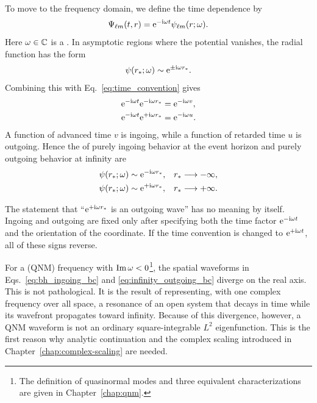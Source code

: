 To move to the frequency domain, we define the time dependence by
\begin{equation}
\Psi_{\ell m}(t,r)
=
\mathrm{e}^{-\mathrm{i}\omega t}\psi_{\ell m}(r;\omega).
\label{eq:time_convention}
\end{equation}
Here $\omega\in\mathbb{C}$ is a . In asymptotic regions where the potential vanishes, the radial function has the form
\begin{equation}
\psi(r_*;\omega)
\sim
\mathrm{e}^{\mathord{\pm}\mathrm{i}\omega r_*}.
\label{eq:asymptotic_plane_waves}
\end{equation}
Combining this with Eq.~\eqref{eq:time_convention} gives
\begin{align}
\mathrm{e}^{-\mathrm{i}\omega t}\mathrm{e}^{-\mathrm{i}\omega r_*}
&=
\mathrm{e}^{-\mathrm{i}\omega v},
\label{eq:ingoing_wave}
\\
\mathrm{e}^{-\mathrm{i}\omega t}\mathrm{e}^{+\mathrm{i}\omega r_*}
&=
\mathrm{e}^{-\mathrm{i}\omega u}.
\label{eq:outgoing_wave}
\end{align}
A function of advanced time $v$ is ingoing, while a function of retarded time $u$ is outgoing. Hence the  of purely ingoing behavior at the event horizon and purely outgoing behavior at infinity are
\begin{align}
\psi(r_*;\omega)
&\sim
\mathrm{e}^{-\mathrm{i}\omega r_*},
&& r_*\longrightarrow-\infty,
\label{eq:bh_ingoing_bc}
\\
\psi(r_*;\omega)
&\sim
\mathrm{e}^{+\mathrm{i}\omega r_*},
&& r_*\longrightarrow+\infty.
\label{eq:infinity_outgoing_bc}
\end{align}

\begin{warningbox}
The statement that ``$\mathrm{e}^{+\mathrm{i}\omega r_*}$ is an outgoing wave'' has no meaning by itself. Ingoing and outgoing are fixed only after specifying both the time factor $\mathrm{e}^{-\mathrm{i}\omega t}$ and the orientation of the coordinate. If the time convention is changed to $\mathrm{e}^{+\mathrm{i}\omega t}$, all of these signs reverse.
\end{warningbox}

For a  (QNM) frequency with $\operatorname{Im}\omega<0$\footnote{The definition of quasinormal modes and three equivalent characterizations are given in Chapter~\ref{chap:qnm}.}, the spatial waveforms in Eqs.~\eqref{eq:bh_ingoing_bc} and \eqref{eq:infinity_outgoing_bc} diverge on the real axis. This is not pathological. It is the result of representing, with one complex frequency over all space, a resonance of an open system that decays in time while its wavefront propagates toward infinity. Because of this divergence, however, a QNM waveform is not an ordinary square-integrable $L^2$ eigenfunction. This is the first reason why analytic continuation and the complex scaling introduced in Chapter~\ref{chap:complex-scaling} are needed.

